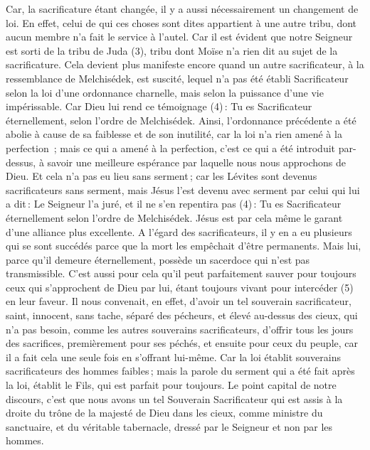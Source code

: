 \begin{multicols}{2}
Car, la sacrificature étant changée, il y a aussi nécessairement un changement de loi.
En effet, celui de qui ces choses sont dites appartient à une autre tribu, dont aucun membre n'a fait le service à l'autel.
Car il est évident que notre Seigneur est sorti de la tribu de Juda (3), tribu dont Moïse n'a rien dit au sujet de la sacrificature.
Cela devient plus manifeste encore quand un autre sacrificateur, à la ressemblance de Melchisédek, est suscité,
lequel n'a pas été établi Sacrificateur selon la loi d’une ordonnance charnelle, mais selon la puissance d’une vie impérissable.
Car Dieu lui rend ce témoignage (4) : Tu es Sacrificateur éternellement, selon l'ordre de Melchisédek.
Ainsi, l’ordonnance précédente a été abolie à cause de sa faiblesse et de son inutilité,
car la loi n’a rien amené à la perfection ; mais ce qui a amené à la perfection, c’est ce qui a été introduit par-dessus, à savoir une meilleure espérance par laquelle nous nous approchons de Dieu.
Et cela n’a pas eu lieu sans serment ;
car les Lévites sont devenus sacrificateurs sans serment, mais Jésus l’est devenu avec serment par celui qui lui a dit : Le Seigneur l'a juré, et il ne s'en repentira pas (4) : Tu es Sacrificateur éternellement selon l'ordre de Melchisédek.
Jésus est par cela même le garant d’une alliance plus excellente.
A l’égard des sacrificateurs, il y en a eu plusieurs qui se sont succédés parce que la mort les empêchait d’être permanents.
Mais lui, parce qu'il demeure éternellement, possède un sacerdoce qui n’est pas transmissible.
C'est aussi pour cela qu’il peut parfaitement sauver pour toujours ceux qui s'approchent de Dieu par lui, étant toujours vivant pour intercéder (5) en leur faveur.
Il nous convenait, en effet, d'avoir un tel souverain sacrificateur, saint, innocent, sans tache, séparé des pécheurs, et élevé au-dessus des cieux,
qui n’a pas besoin, comme les autres souverains sacrificateurs, d'offrir tous les jours des sacrifices, premièrement pour ses péchés, et ensuite pour ceux du peuple, car il a fait cela une seule fois en s’offrant lui-même.
Car la loi établit souverains sacrificateurs des hommes faibles ; mais la parole du serment qui a été fait après la loi, établit le Fils, qui est parfait pour toujours.
\VerseOne{}Le point capital de notre discours, c'est que nous avons un tel Souverain Sacrificateur qui est assis à la droite du trône de la majesté de Dieu dans les cieux,
comme ministre du sanctuaire, et du véritable tabernacle, dressé par le Seigneur et non par les hommes.

\end{multicols}
